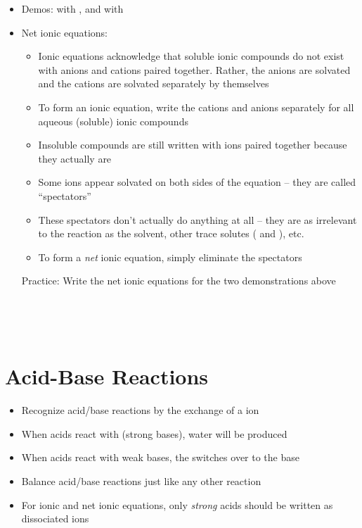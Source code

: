 \documentclass[12pt, openany, letterpaper]{memoir}
\begin{document}
\begin{itemize}
\begin{itemize}
	      \end{itemize}
	\item Demos:  with , and  with 
	\item Net ionic equations:
	      \begin{itemize}
		      \item Ionic equations acknowledge that soluble ionic compounds do not exist with anions and cations paired together. Rather, the anions are solvated and the cations are solvated separately by themselves
		      \item To form an ionic equation, write the cations and anions separately for all aqueous (soluble) ionic compounds
		      \item Insoluble compounds are still written with ions paired together because they actually are
		      \item Some ions appear solvated on both sides of the equation -- they are called ``spectators''
		      \item These spectators don't actually do anything at all -- they are as irrelevant to the reaction as the solvent, other trace solutes ( and ), etc.
		      \item To form a \emph{net} ionic equation, simply eliminate the spectators
	      \end{itemize}

	      Practice: Write the net ionic equations for the two demonstrations above

	      ~\hphantom{Practice:} 

	      ~\hphantom{Practice:} 
\end{itemize}
\section{Acid-Base Reactions}
\begin{itemize}
	\item Recognize acid/base reactions by the exchange of a  ion
	\item When acids react with  (strong bases), water will be produced
	\item When acids react with weak bases, the  switches over to the base
	\item Balance acid/base reactions just like any other reaction
	\item For ionic and net ionic equations, only \emph{strong} acids should be written as dissociated ions
\end{itemize}
\end{document}
